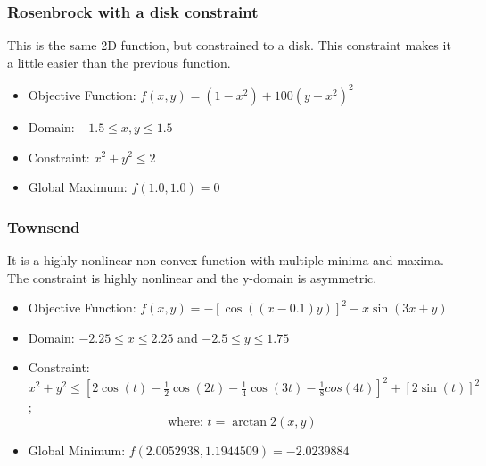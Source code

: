 
\subsubsection{Rosenbrock with a disk constraint}
This is the same 2D function, but constrained to a disk. This constraint makes it a little easier than the previous function.
\begin{itemize}
	\item Objective Function: $f(x,y) = (1-x^2) + 100(y-x^2)^2$
	\item Domain: $-1.5 \leq x,y \leq 1.5$
	\item Constraint: $x^2 + y^2 \leq 2$
	\item Global Maximum: $f(1.0,1.0) = 0$
\end{itemize}

\subsubsection{Townsend}
It is a highly nonlinear non convex function with multiple minima and maxima. The constraint is highly nonlinear and the y-domain is asymmetric.
\begin{itemize}
	\item Objective Function: $f(x,y) = -\left[\cos((x-0.1)y)\right]^2-x\sin(3x+y)$
	\item Domain: $-2.25 \leq x \leq 2.25$ and $-2.5 \leq y \leq 1.75$
	\item Constraint: $x^2 + y^2 \leq \left[2\cos(t)-\frac{1}{2}\cos(2t)-\frac{1}{4}\cos(3t) - \frac{1}{8}cos(4t) \right]^2+\left[2\sin(t)\right]^2 $;  \[ \text{where: } t=\arctan2(x,y) \]
	\item Global Minimum: $f(2.0052938,1.1944509) = -2.0239884$
\end{itemize}

